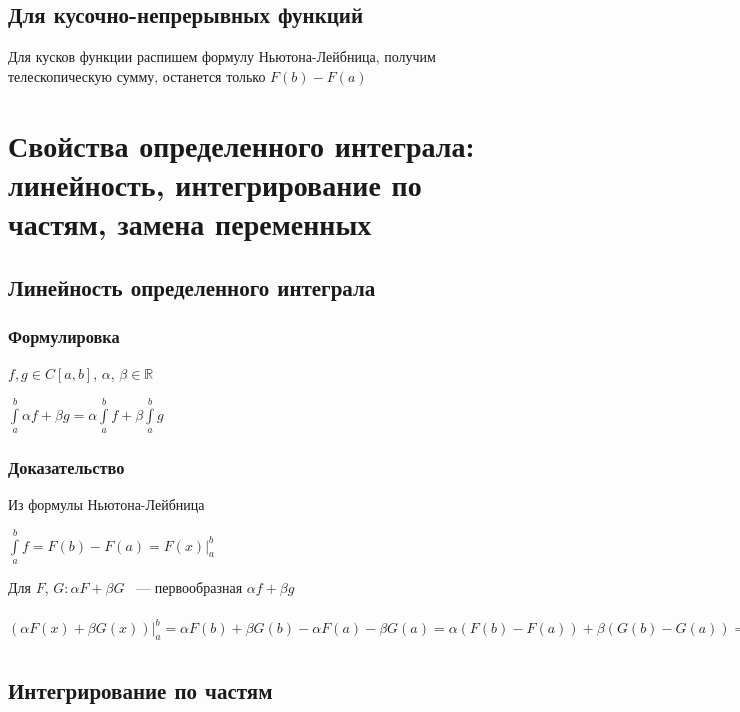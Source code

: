 \documentclass{article}
\begin{document}
        \subsection{Для кусочно-непрерывных функций}
        
            Для кусков функции распишем формулу Ньютона-Лейбница, получим телескопическую сумму, останется только $F(b) - F(a)$
            
	\newpage
	
	\section{Свойства определенного интеграла: линейность, интегрирование по частям, замена переменных}
	
		\subsection{Линейность определенного интеграла}
		
			\subsubsection{Формулировка}
			
                $f, g \in C[a, b]$, $\alpha$, $\beta \in \mathbb{R}$
			
                $\int\limits^b_a \alpha f + \beta g = \alpha \int\limits^b_a f + \beta \int\limits^b_a g$
			
			\subsubsection{Доказательство} 
			
                Из формулы Ньютона-Лейбница
			
                $\int\limits^b_a f = F(b) - F(a) = F(x) \bigg|^b_a$
			
                Для $F$, $G : \alpha F + \beta G$ ~--- первообразная $\alpha f + \beta g$
			
                $\left(\alpha F(x) + \beta G(x)\right) \bigg|^b_a = \alpha F(b) + \beta G(b) - \alpha F(a) - \beta G(a) = \alpha (F(b) - F(a)) + \beta (G(b) - G(a)) = \alpha \int\limits^b_a f + \beta \int\limits^b_a g$
			
		\subsection{Интегрирование по частям}
		
\end{document}
